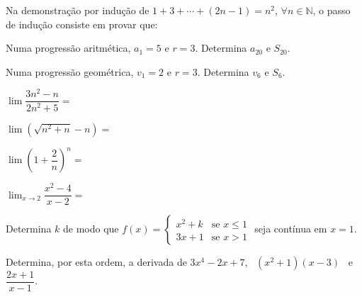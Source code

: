 \documentclass[12pt,a4paper]{article}
\begin{document}
\begin{questoes}[resume]
    \item Na demonstração por indução de
    $1 + 3 + \cdots + (2n - 1) = n^2$, $\forall n \in \mathbb{N}$,
    o passo de indução consiste em provar que:

    \item Numa progressão aritmética, $a_1 = 5$ e $r = 3$.
    Determina $a_{20}$ e $S_{20}$.

    \item Numa progressão geométrica, $v_1 = 2$ e $r = 3$.
    Determina $v_6$ e $S_6$.

    \item $\lim \dfrac{3n^2 - n}{2n^2 + 5} =$

    \item $\lim \left(\sqrt{n^2 + n} - n\right) =$

    \item $\lim \left(1 + \dfrac{2}{n}\right)^{n} =$

    \item $\displaystyle\lim_{x \to 2} \dfrac{x^2 - 4}{x - 2} =$

    \item Determina $k$ de modo que
    $f(x) = \begin{cases} x^2 + k & \text{se } x \leq 1 \\ 3x + 1 & \text{se } x > 1 \end{cases}$
    seja contínua em $x = 1$.

    \item Determina, por esta ordem, a derivada de
    $3x^4 - 2x + 7$, \ $(x^2 + 1)(x - 3)$ \ e \
    $\dfrac{2x + 1}{x - 1}$.


\end{questoes}
\end{document}
